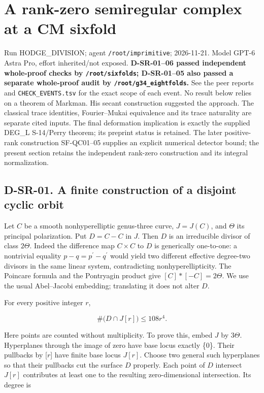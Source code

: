 \section{A rank-zero semiregular complex at a CM sixfold}

Run HODGE\_DIVISION; agent \texttt{/root/imprimitive}; 2026-11-21. Model GPT-6 Astra Pro, effort inherited/not exposed. \textbf{D-SR-01--06 passed independent whole-proof checks by \texttt{/root/sixfolds}; D-SR-01--05 also passed a separate whole-proof audit by \texttt{/root/g34\_eightfolds}.} See the peer reports and \texttt{CHECK\_EVENTS.tsv} for the exact scope of each event. No result below relies on a theorem of Markman. His secant construction suggested the approach. The classical trace identities, Fourier--Mukai equivalence and its trace naturality are separate cited inputs. The final deformation implication is exactly the supplied DEG\_L S-14/Perry theorem; its preprint status is retained. The later positive-rank construction SF-QC01--05 supplies an explicit numerical detector bound; the present section retains the independent rank-zero construction and its integral normalization. \cite{SR-Perry2026}

\subsection{D-SR-01. A finite construction of a disjoint cyclic orbit}
\label{D-SR-01}

Let \(C\) be a smooth nonhyperelliptic genus-three curve, \(J=J(C)\), and \(\Theta\) its principal polarization. Put \(D=C-C\) in \(J\). Then \(D\) is an irreducible divisor of class \(2\Theta\). Indeed the difference map \(C\times C\) to \(D\) is generically one-to-one: a nontrivial equality \(p-q=p^{\prime}-q^{\prime}\) would yield two different effective degree-two divisors in the same linear system, contradicting nonhyperellipticity. The Poincare formula and the Pontryagin product give \([C]*[-C]=2\Theta\). We use the usual Abel--Jacobi embedding; translating it does not alter \(D\). \cite{SR-BirkenhakeLange}

For every positive integer \(r\),

\[
\#\bigl(D\cap J[r]\bigr)\leq 108r^4.\tag{SR1.1}
\]

Here points are counted without multiplicity. To prove this, embed \(J\) by \(3\Theta\). Hyperplanes through the image of zero have base locus exactly \{0\}. Their pullbacks by [\(r\)] have finite base locus \(J[r]\). Choose two general such hyperplanes so that their pullbacks cut the surface \(D\) properly. Each point of \(D\) intersect \(J[r]\) contributes at least one to the resulting zero-dimensional intersection. Its degree is \cite{SR-BauerSzemberg}

